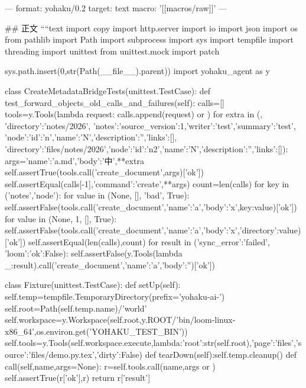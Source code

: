 ---
format: yohaku/0.2
target: text
macro: '[[macros/raw]]'
---

## 正文
````text
import copy
import http.server
import io
import json
import os
from pathlib import Path
import subprocess
import sys
import tempfile
import threading
import unittest
from unittest.mock import patch

sys.path.insert(0,str(Path(__file__).parent))
import yohaku_agent as y

class CreateMetadataBridgeTests(unittest.TestCase):
    def test_forward_objects_old_calls_and_failures(self):
        calls=[]
        tools=y.Tools(lambda request: calls.append(request) or {})
        for extra in ({}, {'directory':'notes/2026'},
                      {'notes':{'source_version':1,'writer':'test','summary':'test'}},
                      {'node':{'id':'n','name':'N','description':'','links':[]}},
                      {'directory':'files/notes/2026','node':{'id':'n2','name':'N','description':'','links':[]}}):
            args={'name':'a.md','body':'中',**extra}
            self.assertTrue(tools.call('create_document',args)['ok'])
            self.assertEqual(calls[-1],{'command':'create',**args})
        count=len(calls)
        for key in ('notes','node'):
            for value in (None, [], 'bad', True):
                self.assertFalse(tools.call('create_document',{'name':'a','body':'x',key:value})['ok'])
        for value in (None, 1, [], True):
            self.assertFalse(tools.call('create_document',{'name':'a','body':'x','directory':value})['ok'])
        self.assertEqual(len(calls),count)
        for result in ({'sync_error':'failed'}, {'loom':{'ok':False}}):
            self.assertFalse(y.Tools(lambda _:result).call('create_document',{'name':'a','body':''})['ok'])

class Fixture(unittest.TestCase):
    def setUp(self):
        self.temp=tempfile.TemporaryDirectory(prefix='yohaku-ai-')
        self.root=Path(self.temp.name)/'world'
        self.workspace=y.Workspace(self.root,y.ROOT/'bin/loom-linux-x86_64',os.environ.get('YOHAKU_TEST_BIN'))
        self.tools=y.Tools(self.workspace.execute,lambda:{'root':str(self.root),'page':'files','source':'files/demo.py.tex','dirty':False})
    def tearDown(self):self.temp.cleanup()
    def call(self,name,args=None):
        r=self.tools.call(name,args or {})
        self.assertTrue(r['ok'],r)
        return r['result']

